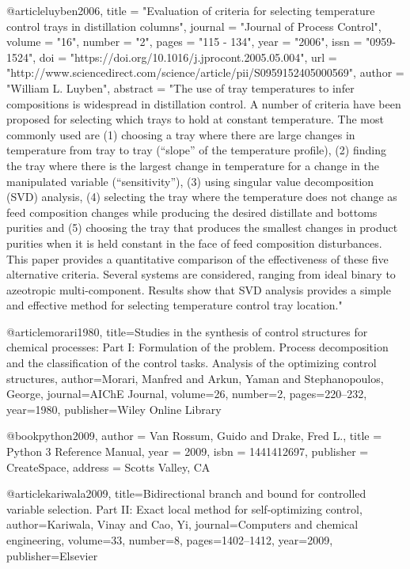 @article{luyben2006,
title = "Evaluation of criteria for selecting temperature control trays in distillation columns",
journal = "Journal of Process Control",
volume = "16",
number = "2",
pages = "115 - 134",
year = "2006",
issn = "0959-1524",
doi = "https://doi.org/10.1016/j.jprocont.2005.05.004",
url = "http://www.sciencedirect.com/science/article/pii/S0959152405000569",
author = "William L. Luyben",
abstract = "The use of tray temperatures to infer compositions is widespread in distillation control. A number of criteria have been proposed for selecting which trays to hold at constant temperature. The most commonly used are (1) choosing a tray where there are large changes in temperature from tray to tray (“slope” of the temperature profile), (2) finding the tray where there is the largest change in temperature for a change in the manipulated variable (“sensitivity”), (3) using singular value decomposition (SVD) analysis, (4) selecting the tray where the temperature does not change as feed composition changes while producing the desired distillate and bottoms purities and (5) choosing the tray that produces the smallest changes in product purities when it is held constant in the face of feed composition disturbances. This paper provides a quantitative comparison of the effectiveness of these five alternative criteria. Several systems are considered, ranging from ideal binary to azeotropic multi-component. Results show that SVD analysis provides a simple and effective method for selecting temperature control tray location."
}

@article{morari1980,
title={Studies in the synthesis of control structures for chemical processes: Part I: Formulation of the problem. Process decomposition and the classification of the control tasks. Analysis of the optimizing control structures},
author={Morari, Manfred and Arkun, Yaman and Stephanopoulos, George},
journal={AIChE Journal},
volume={26},
number={2},
pages={220--232},
year={1980},
publisher={Wiley Online Library}
}

@book{python2009,
 author = {Van Rossum, Guido and Drake, Fred L.},
 title = {Python 3 Reference Manual},
 year = {2009},
 isbn = {1441412697},
 publisher = {CreateSpace},
 address = {Scotts Valley, CA}
}

@article{kariwala2009,
  title={Bidirectional branch and bound for controlled variable selection. Part II: Exact local method for self-optimizing control},
  author={Kariwala, Vinay and Cao, Yi},
  journal={Computers and chemical engineering},
  volume={33},
  number={8},
  pages={1402--1412},
  year={2009},
  publisher={Elsevier}
}

